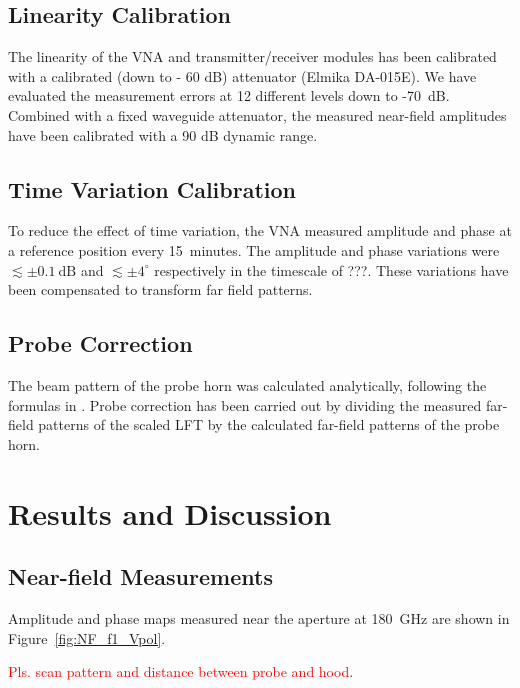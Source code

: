 \documentclass[journal]{IEEEtran}
\newcommand{\red}[1]{\textcolor{red}{#1}}
\begin{document}
\subsection{Linearity Calibration}
The linearity of the VNA and transmitter/receiver modules has been calibrated with a calibrated (down to - 60 dB) attenuator (Elmika DA-015E). We have evaluated the measurement errors at 12 different levels down to -70~dB. Combined with a fixed waveguide attenuator, the measured near-field amplitudes have been calibrated with a 90 dB dynamic range.
%
\subsection{Time Variation Calibration}
To reduce the effect of time variation, the VNA measured amplitude and phase at a reference position every 15~minutes. The amplitude and phase variations were $\lesssim \pm 0.1 \ \mathrm{dB}$ and $\lesssim \pm 4^\circ$ respectively in the timescale of ???. These variations have been compensated to transform far field patterns.
%
\subsection{Probe Correction}
%
The beam pattern of the probe horn was calculated analytically, following the formulas in \cite{Yaghjian1984}. Probe correction has been carried out by dividing the measured far-field patterns of the scaled LFT by the calculated far-field patterns of the probe horn.
%
%
\section{Results and Discussion}
%
\subsection{Near-field Measurements}
%
Amplitude and phase maps measured near the aperture at 180~GHz are shown in Figure~\ref{fig:NF_f1_Vpol}.

\red{Pls. scan pattern and distance between probe and hood}.
\end{document}
